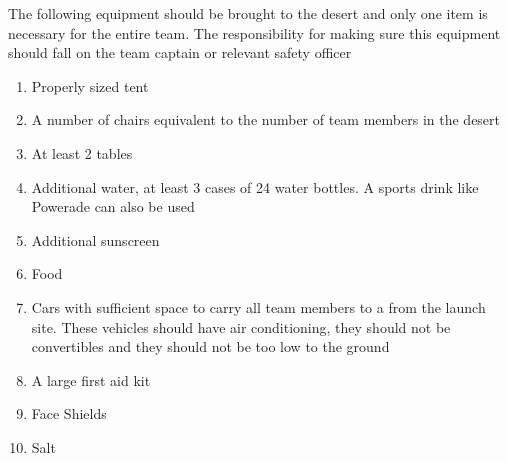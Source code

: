    The following equipment should be brought to the desert and only one item is necessary for the entire team. The responsibility for making sure this equipment should fall on the team captain or relevant safety officer
    \begin{enumerate}
        \item Properly sized tent
        \item A number of chairs equivalent to the number of team members in the desert
        \item At least 2 tables
        \item Additional water, at least 3 cases of 24 water bottles. A sports drink like Powerade can also be used
        \item Additional sunscreen
        \item Food
        \item Cars with sufficient space to carry all team members to a from the launch site. These vehicles should have air conditioning, they should not be convertibles and they should not be too low to the ground
        \item A large first aid kit
        \item Face Shields
        \item Salt
    \end{enumerate}

